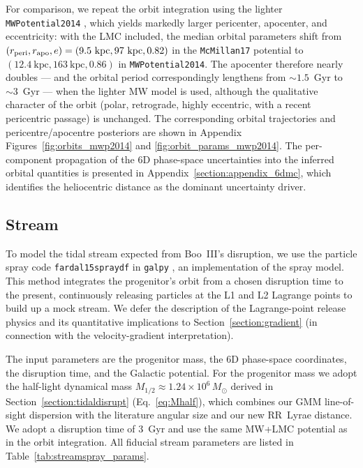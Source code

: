 \documentclass[twocolumn, apj, numberedappendix, appendixfloats]{openjournal_dhayaa}
\begin{document}
For comparison, we repeat the orbit integration using the lighter \texttt{MWPotential2014} \citep{Bovy2015}, which yields markedly larger pericenter, apocenter, and eccentricity: with the LMC included, the median orbital parameters shift from $(r_{\rm peri}, r_{\rm apo}, e) = (9.5~\mathrm{kpc}, 97~\mathrm{kpc}, 0.82)$ in the \texttt{McMillan17} potential to $(12.4~\mathrm{kpc}, 163~\mathrm{kpc}, 0.86)$ in \texttt{MWPotential2014}. The apocenter therefore nearly doubles --- and the orbital period correspondingly lengthens from $\sim 1.5$~Gyr to $\sim 3$~Gyr --- when the lighter MW model is used, although the qualitative character of the orbit (polar, retrograde, highly eccentric, with a recent pericentric passage) is unchanged. The corresponding orbital trajectories and pericentre/apocentre posteriors are shown in Appendix Figures~\ref{fig:orbits_mwp2014} and \ref{fig:orbit_params_mwp2014}. The per-component propagation of the 6D phase-space uncertainties into the inferred orbital quantities is presented in Appendix~\ref{section:appendix_6dmc}, which identifies the heliocentric distance as the dominant uncertainty driver.


\subsection{Stream}\label{section:stream}
To model the tidal stream expected from Boo~III's disruption, we use the particle spray code \texttt{fardal15spraydf} in \texttt{galpy} \citep{Bovy2015}, an implementation of the \citet{Fardal2015} spray model.  This method integrates the progenitor's orbit from a chosen disruption time to the present, continuously releasing particles at the L1 and L2 Lagrange points to build up a mock stream.  We defer the description of the Lagrange-point release physics and its quantitative implications to Section~\ref{section:gradient} (in connection with the velocity-gradient interpretation).

The input parameters are the progenitor mass, the 6D phase-space coordinates, the disruption time, and the Galactic potential. For the progenitor mass we adopt the \citet{Wolf2010} half-light dynamical mass $M_{1/2} \approx 1.24 \times 10^{6}\,M_\odot$ derived in Section~\ref{section:tidaldisrupt} (Eq.~\ref{eq:Mhalf}), which combines our GMM line-of-sight dispersion with the literature angular size and our new RR~Lyrae distance.  We adopt a disruption time of 3~Gyr and use the same MW+LMC potential as in the orbit integration. All fiducial stream parameters are listed in Table~\ref{tab:streamspray_params}.
\end{document}
